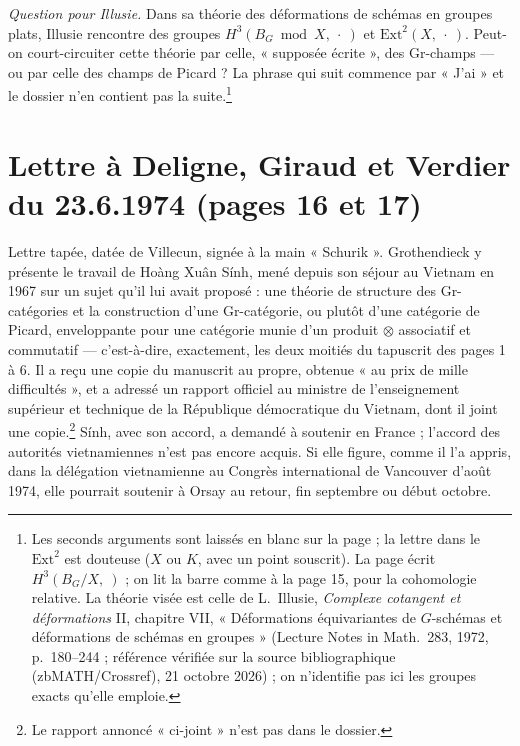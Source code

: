 \documentclass[11pt,a4paper]{article}
\begin{document}
\emph{Question pour Illusie.} Dans sa théorie des déformations de schémas en
groupes plats, Illusie rencontre des groupes $H^3(B_G \bmod X, \ \cdot\ )$ et
$\mathrm{Ext}^2(X, \ \cdot\ )$. Peut-on court-circuiter cette théorie par celle,
« supposée écrite », des Gr-champs --- ou par celle des champs de Picard ?
La phrase qui suit commence par « J'ai » et le dossier n'en contient pas la
suite.\footnote{Les seconds arguments sont laissés en blanc sur la page ; la
lettre dans le $\mathrm{Ext}^2$ est douteuse ($X$ ou $K$, avec un point
souscrit). La page écrit $H^3(B_G/X, \ )$ ; on lit la barre comme à la
page 15, pour la cohomologie relative. La théorie visée est celle de
L.~Illusie, \emph{Complexe cotangent et déformations} II, chapitre VII, « Déformations équivariantes de $G$-schémas et déformations de schémas en groupes » (Lecture Notes in Math.\ 283, 1972, p.~180--244 ; référence vérifiée sur la source bibliographique (zbMATH/Crossref), 21 octobre 2026) ; on n'identifie pas ici les groupes exacts
qu'elle emploie.}

\section*{Lettre à Deligne, Giraud et Verdier du 23.6.1974 (pages 16 et 17)}

Lettre tapée, datée de Villecun, signée à la main « Schurik ». Grothendieck
y présente le travail de Hoàng Xuân Sính, mené depuis son séjour au Vietnam
en 1967 sur un sujet qu'il lui avait proposé : une théorie de structure des
Gr-catégories et la construction d'une Gr-catégorie, ou plutôt d'une
catégorie de Picard, enveloppante pour une catégorie munie d'un produit
$\otimes$ associatif et commutatif --- c'est-à-dire, exactement, les deux
moitiés du tapuscrit des pages 1 à 6. Il a reçu une copie du manuscrit au
propre, obtenue « au prix de mille difficultés », et a adressé un rapport
officiel au ministre de l'enseignement supérieur et technique de la
République démocratique du Vietnam, dont il joint une copie.\footnote{Le
rapport annoncé « ci-joint » n'est pas dans le dossier.} Sính, avec son
accord, a demandé à soutenir en France ; l'accord des autorités
vietnamiennes n'est pas encore acquis. Si elle figure, comme il l'a appris,
dans la délégation vietnamienne au Congrès international de Vancouver
d'août 1974, elle pourrait soutenir à Orsay au retour, fin septembre ou début
octobre.
\end{document}
